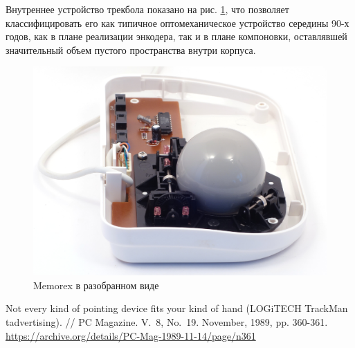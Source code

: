\documentclass[11pt, a4paper]{article}
\begin{document}
Внутреннее устройство трекбола показано на рис. \ref{fig:MemorexInside}, что позволяет классифицировать его как типичное оптомеханическое устройство середины 90-х годов, как в плане реализации энкодера, так и в плане компоновки, оставлявшей значительный объем пустого пространства внутри корпуса.

\begin{figure}[h]
    \centering
    \includegraphics[scale=0.6]{1994_memorex_trackball/inside_30.jpg}
    \caption{Memorex в разобранном виде}
    \label{fig:MemorexInside}
\end{figure}

\begin{thebibliography}{9}
 Not every kind of pointing device fits your kind of hand (LOGiTECH TrackMan tadvertising). // PC Magazine. V.~8, No.~19. November, 1989, pp. 360-361. \url{https://archive.org/details/PC-Mag-1989-11-14/page/n361}
\end{thebibliography}
\end{document}
